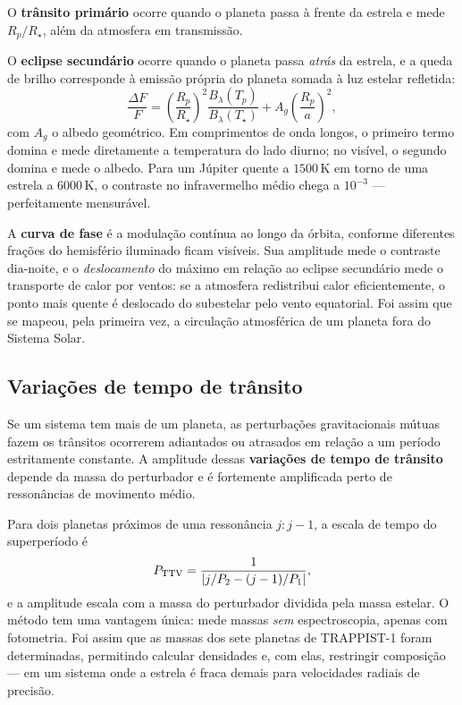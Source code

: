 \documentclass[11pt,a4paper]{article}
\begin{document}
O \textbf{trânsito primário} ocorre quando o planeta passa à frente da estrela e mede $R_p/R_\star$, além da atmosfera em transmissão.

O \textbf{eclipse secundário} ocorre quando o planeta passa \emph{atrás} da estrela, e a queda de brilho corresponde à emissão própria do planeta somada à luz estelar refletida:
\[
\frac{\Delta F}{F}=\left(\frac{R_p}{R_\star}\right)^{2}\frac{B_\lambda(T_p)}{B_\lambda(T_\star)}+A_g\left(\frac{R_p}{a}\right)^{2},
\]
com $A_g$ o albedo geométrico. Em comprimentos de onda longos, o primeiro termo domina e mede diretamente a temperatura do lado diurno; no visível, o segundo domina e mede o albedo. Para um Júpiter quente a $1500\,\mathrm{K}$ em torno de uma estrela a $6000\,\mathrm{K}$, o contraste no infravermelho médio chega a $10^{-3}$ --- perfeitamente mensurável.

A \textbf{curva de fase} é a modulação contínua ao longo da órbita, conforme diferentes frações do hemisfério iluminado ficam visíveis. Sua amplitude mede o contraste dia-noite, e o \emph{deslocamento} do máximo em relação ao eclipse secundário mede o transporte de calor por ventos: se a atmosfera redistribui calor eficientemente, o ponto mais quente é deslocado do subestelar pelo vento equatorial. Foi assim que se mapeou, pela primeira vez, a circulação atmosférica de um planeta fora do Sistema Solar.

\subsection*{Variações de tempo de trânsito}

Se um sistema tem mais de um planeta, as perturbações gravitacionais mútuas fazem os trânsitos ocorrerem adiantados ou atrasados em relação a um período estritamente constante. A amplitude dessas \textbf{variações de tempo de trânsito} depende da massa do perturbador e é fortemente amplificada perto de ressonâncias de movimento médio.

Para dois planetas próximos de uma ressonância $j:j-1$, a escala de tempo do superperíodo é
\[
P_{\rm TTV}=\frac{1}{\left|j/P_2-(j-1)/P_1\right|},
\]
e a amplitude escala com a massa do perturbador dividida pela massa estelar. O método tem uma vantagem única: mede massas \emph{sem} espectroscopia, apenas com fotometria. Foi assim que as massas dos sete planetas de TRAPPIST-1 foram determinadas, permitindo calcular densidades e, com elas, restringir composição --- em um sistema onde a estrela é fraca demais para velocidades radiais de precisão.
\end{document}
